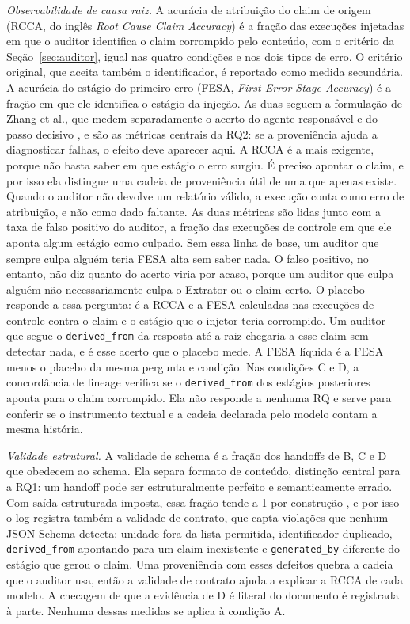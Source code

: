 \emph{Observabilidade de causa raiz.}
A acurácia de atribuição do claim de origem (RCCA, do inglês \emph{Root Cause Claim Accuracy}) é a fração das execuções injetadas em que o auditor identifica o claim corrompido pelo conteúdo, com o critério da Seção~\ref{sec:auditor}, igual nas quatro condições e nos dois tipos de erro. O critério original, que aceita também o identificador, é reportado como medida secundária.
A acurácia do estágio do primeiro erro (FESA, \emph{First Error Stage Accuracy}) é a fração em que ele identifica o estágio da injeção.
As duas seguem a formulação de Zhang et al., que medem separadamente o acerto do agente responsável e do passo decisivo \cite{zhang2025which}, e são as métricas centrais da RQ2: se a proveniência ajuda a diagnosticar falhas, o efeito deve aparecer aqui.
A RCCA é a mais exigente, porque não basta saber em que estágio o erro surgiu. É preciso apontar o claim, e por isso ela distingue uma cadeia de proveniência útil de uma que apenas existe.
Quando o auditor não devolve um relatório válido, a execução conta como erro de atribuição, e não como dado faltante.
As duas métricas são lidas junto com a taxa de falso positivo do auditor, a fração das execuções de controle em que ele aponta algum estágio como culpado. Sem essa linha de base, um auditor que sempre culpa alguém teria FESA alta sem saber nada.
O falso positivo, no entanto, não diz quanto do acerto viria por acaso, porque um auditor que culpa alguém não necessariamente culpa o Extrator ou o claim certo.
O placebo responde a essa pergunta: é a RCCA e a FESA calculadas nas execuções de controle contra o claim e o estágio que o injetor teria corrompido. Um auditor que segue o \texttt{derived\_from} da resposta até a raiz chegaria a esse claim sem detectar nada, e é esse acerto que o placebo mede. A FESA líquida é a FESA menos o placebo da mesma pergunta e condição.
Nas condições C e D, a concordância de lineage verifica se o \texttt{derived\_from} dos estágios posteriores aponta para o claim corrompido. Ela não responde a nenhuma RQ e serve para conferir se o instrumento textual e a cadeia declarada pelo modelo contam a mesma história.

\emph{Validade estrutural.}
A validade de schema é a fração dos handoffs de B, C e D que obedecem ao schema.
Ela separa formato de conteúdo, distinção central para a RQ1: um handoff pode ser estruturalmente perfeito e semanticamente errado.
Com saída estruturada imposta, essa fração tende a 1 por construção \cite{ray2026constraint}, e por isso o log registra também a validade de contrato, que capta violações que nenhum JSON Schema detecta: unidade fora da lista permitida, identificador duplicado, \texttt{derived\_from} apontando para um claim inexistente e \texttt{generated\_by} diferente do estágio que gerou o claim.
Uma proveniência com esses defeitos quebra a cadeia que o auditor usa, então a validade de contrato ajuda a explicar a RCCA de cada modelo.
A checagem de que a evidência de D é literal do documento é registrada à parte. Nenhuma dessas medidas se aplica à condição A.

